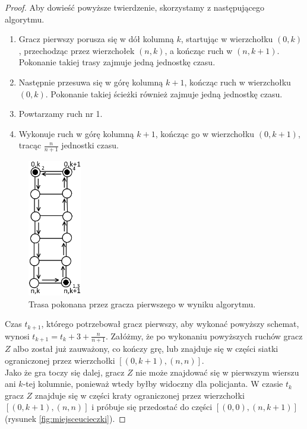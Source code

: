 \documentclass[brudnopis]{xmgr}
\theoremstyle{definition}
\begin{document}
\begin{proof}
	Aby dowieść powyższe twierdzenie, skorzystamy z następującego algorytmu.
	\begin{enumerate}
		\item Gracz pierwszy porusza się w dół kolumną $k$, startując w wierzchołku $(0,k)$, przechodząc przez wierzchołek $(n, k)$, a kończąc ruch w $(n, k + 1)$. Pokonanie takiej trasy zajmuje jedną jednostkę czasu.
		\item Następnie przesuwa się w górę kolumną $k + 1$, kończąc ruch w wierzchołku $(0,k)$. Pokonanie takiej ścieżki również zajmuje jedną jednostkę czasu.
		\item Powtarzamy ruch nr 1.
		\item Wykonuje ruch w górę kolumną $k + 1$, kończąc go w wierzchołku $(0,k + 1)$, tracąc $\frac{n}{n+1}$ jednostki czasu.
	\end{enumerate}
	\begin{figure}[ht!]
	  \centering
	  \includegraphics[height=6cm]{rysunki/schemat_ruchu.png}
	  \caption{Trasa pokonana przez gracza pierwszego w wyniku algorytmu.}
	\end{figure} 

	Czas $t_{k+1}$, którego potrzebował gracz pierwszy, aby wykonać powyższy schemat, wynosi $t_{k+1} = t_k + 3 + \frac{n}{n+1}$.
	Załóżmy, że po wykonaniu powyższych ruchów gracz $Z$ albo został już zauważony, co kończy grę, lub znajduje się w części siatki ograniczonej przez wierzchołki $[(0,k + 1), (n, n)]$.
	\\\indent Jako że gra toczy się dalej, gracz $Z$ nie może znajdować się w pierwszym wierszu ani $k$-tej kolumnie, ponieważ wtedy byłby widoczny dla policjanta. W czasie $t_k$ gracz $Z$ znajduje się w części kraty ograniczonej przez wierzchołki $[(0,k + 1), (n, n)]$ i próbuje się przedostać do części $[(0,0), (n, k + 1)]$ (rysunek \ref{fig:miejsceucieczki}).


\end{proof}
\end{document}
